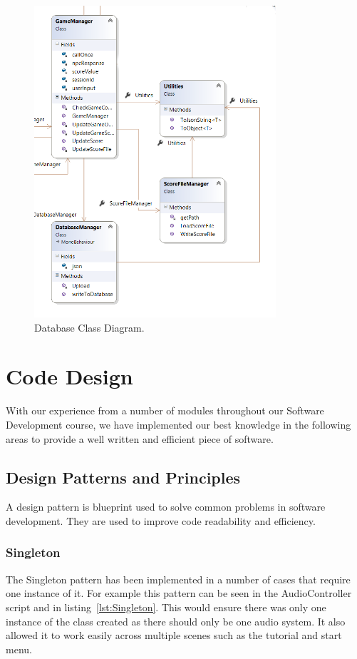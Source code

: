 \begin{figure}[ht]
	\caption{Database Class Diagram.}
	\label{image:Database}
	\centering
	\includegraphics[width=0.8\textwidth]{Images/ClassDiagram Database.png}
\end{figure}

\newpage

\section{Code Design}
With our experience from a number of modules throughout our Software Development course, we have implemented our best knowledge in the following areas to provide a well written and efficient piece of software.

\subsection{Design Patterns and Principles}
A design pattern is blueprint used to solve common problems in software development. They are used to improve code readability and efficiency. 

\subsubsection{Singleton}
The Singleton pattern has been implemented in a number of cases that require one instance of it. For example this pattern can be seen in the AudioController script and in listing~\ref{lst:Singleton}. This would ensure there was only one instance of the class created as there should only be one audio system. It also allowed it to work easily across multiple scenes such as the tutorial and start menu.

